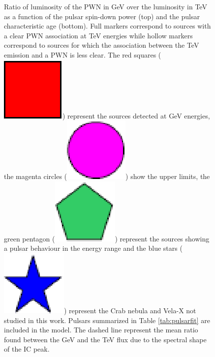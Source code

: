 \begin{figure}[h!]
\caption{Ratio of luminosity of the PWN in GeV over the luminosity in TeV as a function of the pulsar spin-down power (top) and the pulsar characteristic age (bottom). Full markers correspond to sources with a clear PWN association at TeV energies while hollow markers correspond to sources for which the association between the TeV emission and a PWN is less clear. The red squares (\protect\includegraphics[scale=0.25]{figures/carrerouge.eps}) represent the sources detected at GeV energies, the magenta circles (\protect\includegraphics[scale=0.25]{figures/rondmagenta.eps}) show the upper limits, the green pentagon (\protect\includegraphics[scale=0.25]{figures/pentagonevert.eps}) represent the sources showing a pulsar behaviour in the energy range and the blue stars (\protect\includegraphics[scale=0.25]{figures/etoilebleue.eps}) represent the Crab nebula and Vela-X not studied in this work. Pulsars summarized in Table \ref{tab:pulsarfit} are included in the model. The dashed line represent the mean ratio found between the GeV and the TeV flux due to the spectral shape of the IC peak.
\label{fig:rapportTeV}}
\end{figure}

